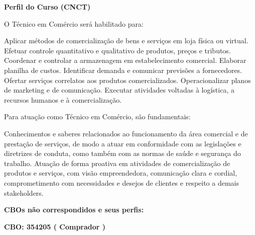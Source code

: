 \documentclass[
]{article}
\begin{document}
\textbf{Perfil do Curso (CNCT)}

O Técnico em Comércio será habilitado para:

Aplicar métodos de comercialização de bens e serviços em loja física ou
virtual. Efetuar controle quantitativo e qualitativo de produtos, preços
e tributos. Coordenar e controlar a armazenagem em estabelecimento
comercial. Elaborar planilha de custos. Identificar demanda e comunicar
previsões a fornecedores. Ofertar serviços correlatos aos produtos
comercializados. Operacionalizar planos de marketing e de comunicação.
Executar atividades voltadas à logística, a recursos humanos e à
comercialização.

Para atuação como Técnico em Comércio, são fundamentais:

Conhecimentos e saberes relacionados ao funcionamento da área comercial
e de prestação de serviços, de modo a atuar em conformidade com as
legislações e diretrizes de conduta, como também com as normas de saúde
e segurança do trabalho. Atuação de forma proativa em atividades de
comercialização de produtos e serviços, com visão empreendedora,
comunicação clara e cordial, comprometimento com necessidades e desejos
de clientes e respeito a demais stakeholders.

\textbf{CBOs não correspondidos e seus perfis:}

\textbf{CBO: 354205  ( Comprador )}
\end{document}
